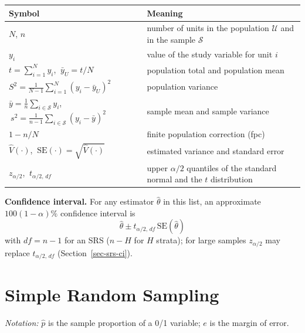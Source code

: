 \documentclass[
  letterpaper,
  DIV=11,
  numbers=noendperiod]{scrreprt}
\newcounter{none} %
\renewcommand{\[}{\begin{equation}}
\renewcommand{\]}{\end{equation}}
\begin{document}
{\def\LTcaptype{none} %
\begin{longtable}[]{@{}
  >{\raggedright\arraybackslash}p{}
  >{\raggedright\arraybackslash}p{}@{}}
\toprule\noalign{}
\begin{minipage}[b]{\linewidth}\raggedright
Symbol
\end{minipage} & \begin{minipage}[b]{\linewidth}\raggedright
Meaning
\end{minipage} \\
\midrule\noalign{}
\endhead
\bottomrule\noalign{}
\endlastfoot
\(N\), \(n\) & number of units in the population \(\mathcal U\) and in
the sample \(\mathcal S\) \\
\(y_i\) & value of the study variable for unit \(i\) \\
\(t = \sum_{i=1}^N y_i\), \(\ \bar y_U = t/N\) & population total and
population mean \\
\(S^2 = \frac{1}{N-1}\sum_{i=1}^N (y_i-\bar y_U)^2\) & population
variance \\
\(\bar y = \frac1n\sum_{i\in\mathcal S} y_i\),
\(\ s^2 = \frac{1}{n-1}\sum_{i\in\mathcal S}(y_i-\bar y)^2\) & sample
mean and sample variance \\
\(1 - n/N\) & finite population correction (fpc) \\
\(\hat V(\cdot)\), \(\ \mathrm{SE}(\cdot) = \sqrt{\hat V(\cdot)}\) &
estimated variance and standard error \\
\(z_{\alpha/2}\), \(\ t_{\alpha/2,\,df}\) & upper \(\alpha/2\) quantiles
of the standard normal and the \(t\) distribution \\
\end{longtable}
}

\textbf{Confidence interval.} For any estimator \(\hat\theta\) in this
list, an approximate \(100(1-\alpha)\%\) confidence interval is \[
\boxed{\hat\theta \pm t_{\alpha/2,\,df}\,\mathrm{SE}(\hat\theta)}
\] with \(df = n-1\) for an SRS (\(n - H\) for \(H\) strata); for large
samples \(z_{\alpha/2}\) may replace \(t_{\alpha/2,\,df}\)
(Section~\ref{sec-srs-ci}).

\section{Simple Random Sampling}\label{simple-random-sampling-1}

\emph{Notation:} \(\hat p\) is the sample proportion of a 0/1 variable;
\(e\) is the margin of error.
\end{document}
